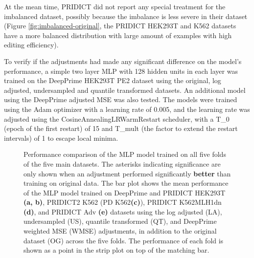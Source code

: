 At the mean time, PRIDICT did not report any special treatment for the imbalanced dataset, possibly because the imbalance is less severe in their dataset (Figure \ref{fig:imbalanced-original}, the PRIDICT HEK293T and K562 datasets have a more balanced distribution with large amount of examples with high editing efficiency). 

To verify if the adjustments had made any significant difference on the model's performance, a simple two layer MLP with 128 hidden units in each layer was trained on the DeepPrime HEK293T PE2 dataset using the original, log adjusted, undersampled and quantile transformed datasets. An additional model using the DeepPrime adjusted MSE was also tested. The models were trained using the Adam optimizer with a learning rate of 0.005, and the learning rate was adjusted using the CosineAnnealingLRWarmRestart scheduler, with a T\_0 (epoch of the first restart) of 15 and T\_mult (the factor to extend the restart intervals) of 1 to escape local minima. 

\begin{figure}
    \centering
    \vspace{-3mm} %
    \vspace{-3mm}
    \vspace{-3mm}
    \vspace{-3mm}
    \vspace{-3mm}
    \caption[MLP model performance comparison after adjustments]{Performance comparison of the MLP model trained on all five folds of the five main datasets. The asterisks indicating significance are only shown when an adjustment performed significantly \textbf{better} than training on original data. The bar plot shows the mean performance of the MLP model trained on DeepPrime and PRIDICT HEK293T \textbf{(a, b)}, PRIDICT2 K562 (PD K562\textbf{(c)}), PRIDICT K562MLH1dn \textbf{(d)}, and PRIDICT Adv \textbf{(e)} datasets using the log adjusted (LA), undersampled (US), quantile transformed (QT), and DeepPrime weighted MSE (WMSE) adjustments, in addition to the original dataset (OG) across the five folds. The performance of each fold is shown as a point in the strip plot on top of the matching bar.}
    \label{fig:adjustment-performance}
\end{figure}

